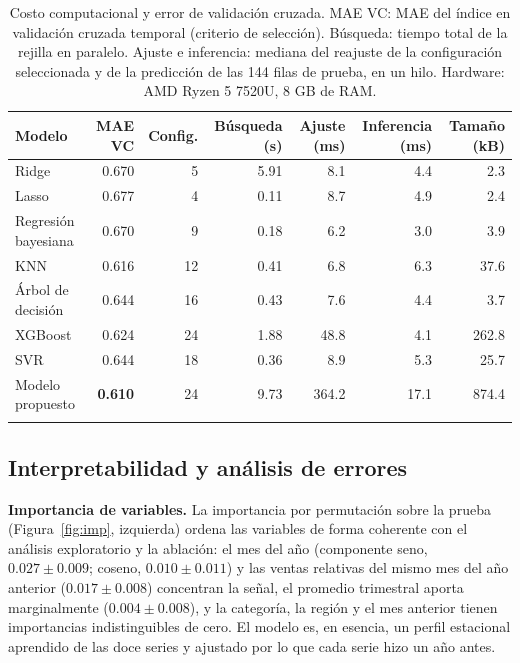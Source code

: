 \documentclass[pdflatex,sn-mathphys-num]{sn-jnl}
\begin{document}
\begin{table}[!htb]
\caption{Costo computacional y error de validación cruzada. MAE VC: MAE del índice en validación cruzada temporal (criterio de selección). Búsqueda: tiempo total de la rejilla en paralelo. Ajuste e inferencia: mediana del reajuste de la configuración seleccionada y de la predicción de las 144 filas de prueba, en un hilo. Hardware: AMD Ryzen 5 7520U, 8 GB de RAM.}\label{tab:costo}
\footnotesize
\begin{tabular*}{\textwidth}{@{\extracolsep\fill}lrrrrrr}
\toprule
Modelo & MAE VC & Config. & Búsqueda (s) & Ajuste (ms) & Inferencia (ms) & Tamaño (kB) \\
\midrule
Ridge & 0.670 & 5 & 5.91 & 8.1 & 4.4 & 2.3 \\
Lasso & 0.677 & 4 & 0.11 & 8.7 & 4.9 & 2.4 \\
Regresión bayesiana & 0.670 & 9 & 0.18 & 6.2 & 3.0 & 3.9 \\
KNN & 0.616 & 12 & 0.41 & 6.8 & 6.3 & 37.6 \\
Árbol de decisión & 0.644 & 16 & 0.43 & 7.6 & 4.4 & 3.7 \\
XGBoost & 0.624 & 24 & 1.88 & 48.8 & 4.1 & 262.8 \\
SVR & 0.644 & 18 & 0.36 & 8.9 & 5.3 & 25.7 \\
Modelo propuesto & \textbf{0.610} & 24 & 9.73 & 364.2 & 17.1 & 874.4 \\
\botrule
\end{tabular*}
\end{table}

\subsection{Interpretabilidad y análisis de errores}\label{subsec:errores}

\textbf{Importancia de variables.} La importancia por permutación sobre la prueba (Figura~\ref{fig:imp}, izquierda) ordena las variables de forma coherente con el análisis exploratorio y la ablación: el mes del año (componente seno, $0.027\pm0.009$; coseno, $0.010\pm0.011$) y las ventas relativas del mismo mes del año anterior ($0.017\pm0.008$) concentran la señal, el promedio trimestral aporta marginalmente ($0.004\pm0.008$), y la categoría, la región y el mes anterior tienen importancias indistinguibles de cero. El modelo es, en esencia, un perfil estacional aprendido de las doce series y ajustado por lo que cada serie hizo un año antes.
\end{document}
